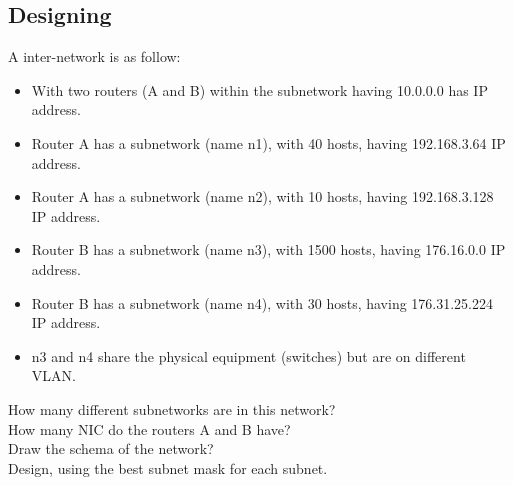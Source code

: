 \documentclass[11pt]{article}
\begin{document}
\subsection{Designing}
A inter-network is as follow:
\begin{itemize}
  \item With two routers (A and B) within the subnetwork having 10.0.0.0 has IP address.
  \item Router A has a subnetwork (name n1), with 40 hosts, having 192.168.3.64 IP address.
  \item Router A has a subnetwork (name n2), with 10 hosts, having 192.168.3.128 IP address.
  \item Router B has a subnetwork (name n3), with 1500 hosts, having 176.16.0.0 IP address.
  \item Router B has a subnetwork (name n4), with 30 hosts, having 176.31.25.224 IP address.
  \item n3 and n4 share the physical equipment (switches) but are on different VLAN.
\end{itemize}

How many different subnetworks are in this network?\\
How many NIC do the routers A and B have?\\
Draw the schema of the network?\\
Design, using the best subnet mask for each subnet.
\end{document}
